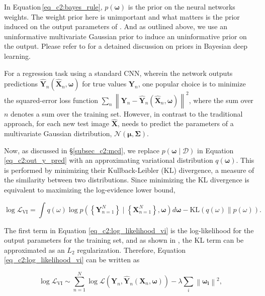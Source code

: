In Equation\,\ref{eq_c2:bayes_rule}, $p(\boldsymbol{\omega})$ is the prior on the neural networks weights. The weight prior here is unimportant and what matters is the prior induced on the output parameters of \gampen{}. And as outlined above, we use an uninformative multivariate Gaussian prior to induce an uninformative prior on the output. Please refer to \cite{wilson_20} for a detained discussion on priors in Bayesian deep learning. 

For a regression task using a standard CNN, wherein the network outputs predictions  $\hat{\boldsymbol{Y}}_{n}\left(\boldsymbol{\hat{X}}_{n}, \boldsymbol{\omega}\right)$ for true values $\boldsymbol{Y}_{n}$, one popular choice is to minimize the squared-error loss function $\sum_{n} \left\|\boldsymbol{Y}_n-\boldsymbol{\hat{Y}}_n\left(\boldsymbol{\hat{X}}_n, \boldsymbol{\omega}\right)\right\|^{2}$, where the sum over $n$ denotes a sum over the training set. However, in contrast to the traditional approach, for each new test image $\boldsymbol{\hat{X}}$, \gampen{} needs to predict the parameters of a multivariate Gaussian distribution, $\mathcal{N}(\boldsymbol{\mu}, \boldsymbol{\Sigma})$. 

Now, as discussed in \S \ref{subsec_c2:mcd}, we replace $p(\boldsymbol{\omega} \mid \mathcal{D})$ in Equation \ref{eq_c2:out_y_pred} with an approximating variational distribution $q(\boldsymbol{\omega})$. This is performed by minimizing their Kullback-Leibler (KL) divergence, a measure of the similarity between two distributions. Since minimizing the KL divergence is equivalent to maximizing the log-evidence lower bound,

\begin{equation}
\log \mathcal{L}_{\mathrm{VI}}= \int q(\omega) \log p( \left\{\boldsymbol{Y}_{n=1}^{N}\right\} \mid \left\{\boldsymbol{X}_{n=1}^N\right\}, \boldsymbol{\omega}) d \boldsymbol{\omega}  - \mathrm{KL}(q(\omega) \| p(\omega)) .
\label{eq_c2:log_likelihood_vi}
\end{equation}

\noindent
The first term in Equation \ref{eq_c2:log_likelihood_vi} is the log-likelihood for the output parameters for the training set, and as shown in \cite{gal_2016}, the KL term can be approximated as an $L_2$ regularization. Therefore, Equation \ref{eq_c2:log_likelihood_vi} can be written as 

\begin{equation}
\log \mathcal{L}_{\mathrm{VI}} \sim \sum_{n=1}^{N} \log \mathcal{L}\left(\boldsymbol{Y}_{n}, \boldsymbol{\hat{Y}}_{n}\left(\boldsymbol{X}_{n}, \boldsymbol{\omega}\right)\right)-\lambda \sum_{i}\left\|\boldsymbol{\omega_{i}}\right\|^{2} ,
\label{eq_c2:log_likelihood_vi_2}
\end{equation}

